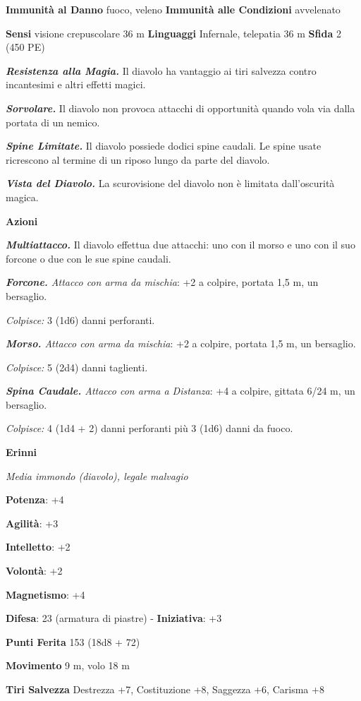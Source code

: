 \begin{multicols}{2}
\textbf{Immunità al Danno} fuoco, veleno \textbf{Immunità alle
Condizioni} avvelenato

\textbf{Sensi} visione crepuscolare 36 m
\textbf{Linguaggi} Infernale, telepatia 36 m \textbf{Sfida} 2 (450 PE)

\emph{\textbf{Resistenza alla Magia.}} Il diavolo ha vantaggio ai tiri
salvezza contro incantesimi e altri effetti magici.

\emph{\textbf{Sorvolare.}} Il diavolo non provoca attacchi di
opportunità quando vola via dalla portata di un nemico.

\emph{\textbf{Spine Limitate.}} Il diavolo possiede dodici spine
caudali. Le spine usate ricrescono al termine di un riposo lungo da
parte del diavolo.

\emph{\textbf{Vista del Diavolo.}} La scurovisione del diavolo non è
limitata dall'oscurità magica.

\textbf{Azioni}

\emph{\textbf{Multiattacco.}} Il diavolo effettua due attacchi: uno con
il morso e uno con il suo forcone o due con le sue spine caudali.

\emph{\textbf{Forcone.} Attacco con arma da mischia}: +2 a colpire,
portata 1,5 m, un bersaglio.

\emph{Colpisce:} 3 (1d6) danni perforanti.

\emph{\textbf{Morso.} Attacco con arma da mischia}: +2 a colpire,
portata 1,5 m, un bersaglio.

\emph{Colpisce:} 5 (2d4) danni taglienti.

\emph{\textbf{Spina Caudale.} Attacco con arma a Distanza}: +4 a
colpire, gittata 6/24 m, un bersaglio.

\emph{Colpisce:} 4 (1d4 + 2) danni perforanti più 3 (1d6) danni da
fuoco.

\textbf{Erinni}

\emph{Media immondo (diavolo), legale malvagio}

\textbf{Potenza}: +4

\textbf{Agilità}: +3

\textbf{Intelletto}: +2

\textbf{Volontà}: +2

\textbf{Magnetismo}: +4

\textbf{Difesa}: 23 (armatura di piastre) - \textbf{Iniziativa}: +3

\textbf{Punti Ferita} 153 (18d8 + 72)

\textbf{Movimento} 9 m, volo 18 m

\textbf{Tiri Salvezza} Destrezza +7, Costituzione +8, Saggezza +6,
Carisma +8


\end{multicols}

